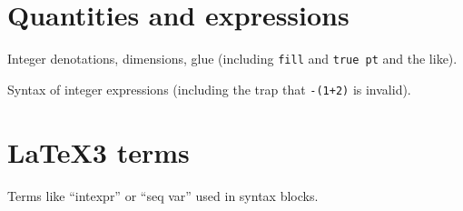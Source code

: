 \documentclass{l3doc}
\begin{document}
\section{Quantities and expressions}

Integer denotations, dimensions, glue (including \texttt{fill} and \texttt{true pt} and the like).

Syntax of integer expressions (including the trap that \verb|-(1+2)| is invalid).

\section{\LaTeX3 terms}

Terms like ``intexpr'' or ``seq var'' used in syntax blocks.
\end{document}
